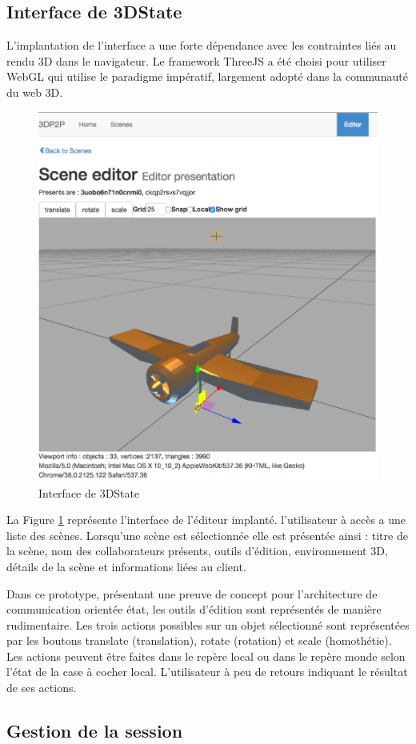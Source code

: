 \subsection{Interface de 3DState}
L'implantation de l'interface a une forte dépendance avec les contraintes liés au 
rendu 3D dans le navigateur. Le framework ThreeJS a été choisi pour utiliser 
WebGL qui utilise le paradigme impératif, largement adopté dans la communauté 
du web 3D.

\begin{figure}[h]
	\centering
	\includegraphics[width=0.5\columnwidth]{eps/editorpresentation.eps}
	\caption{Interface de 3DState}
	\label{fig:3Dstateinterface}
\end{figure}

La Figure \ref{fig:3Dstateinterface} représente l'interface de l'éditeur implanté. 
l'utilisateur à accès a une liste des scènes. Lorsqu'une scène est sélectionnée elle 
est présentée ainsi : titre de la scène, nom des collaborateurs présents, outils 
d'édition, environnement 3D, détails de la scène et informations liées au client.


Dans ce prototype, présentant une preuve de concept pour l'architecture de 
communication orientée état, les outils d'édition sont représentés de manière 
rudimentaire. Les trois actions possibles sur un objet sélectionné sont 
représentées par les boutons \og translate\fg{} (translation), \og rotate\fg{} 
(rotation) et \og scale\fg{} (homothétie). Les actions peuvent être faites dans le 
repère \og local\fg{} ou dans le repère \og monde\fg{} selon l'état de la case à 
cocher \og local\fg{}. L'utilisateur à peu de retours indiquant le résultat de ses 
actions.



\subsection{Gestion de la session}

